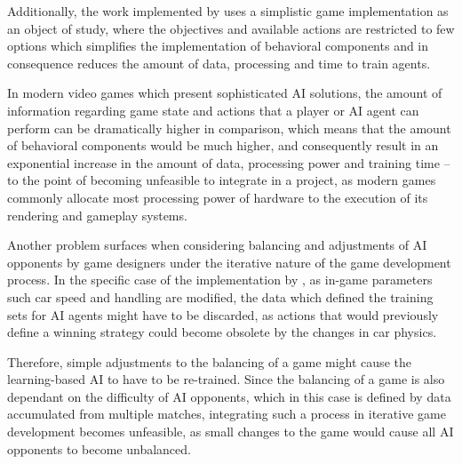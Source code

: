 Additionally, the work implemented by \citet{article_adaptivebehaviorai} uses a simplistic game implementation as an object of study, where the objectives and available actions are restricted to few options which simplifies the implementation of behavioral components and in consequence reduces the amount of data, processing and time to train agents.

In modern video games which present sophisticated AI solutions, the amount of information regarding game state and actions that a player or AI agent can perform can be dramatically higher in comparison, which means that the amount of behavioral components would be much higher, and consequently result in an exponential increase in the amount of data, processing power and training time -- to the point of becoming unfeasible to integrate in a project, as modern games commonly allocate most processing power of hardware to the execution of its rendering and gameplay systems.

Another problem surfaces when considering balancing and adjustments of AI opponents by game designers under the iterative nature of the game development process. In the specific case of the implementation by \citet{article_adaptivebehaviorai}, as in-game parameters such car speed and handling are modified, the data which defined the training sets for AI agents might have to be discarded, as actions that would previously define a winning strategy could become obsolete by the changes in car physics. 

Therefore, simple adjustments to the balancing of a game might cause the learning-based AI to have to be re-trained. Since the balancing of a game is also dependant on the difficulty of AI opponents, which in this case is defined by data accumulated from multiple matches, integrating such a process in iterative game development becomes unfeasible, as small changes to the game would cause all AI opponents to become unbalanced.


